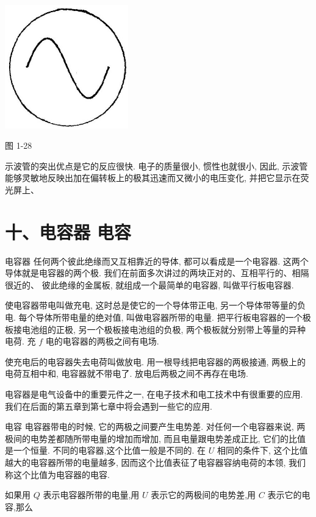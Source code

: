 \documentclass[10pt]{article}
\begin{document}
\begin{center}
\includegraphics[max width=0.4\textwidth]{images/01913056-1f15-74d8-9184-9aab52c9d66b_42_664272.jpg}
\end{center}

图 1-28

示波管的突出优点是它的反应很快. 电子的质量很小, 惯性也就很小, 因此, 示波管能够灵敏地反映出加在偏转板上的极其迅速而又微小的电压变化, 并把它显示在荧光屏上、

\section*{十、电容器 电容}

电容器 任何两个彼此绝缘而又互相靠近的导体, 都可以看成是一个电容器. 这两个导体就是电容器的两个极. 我们在前面多次讲过的两块正对的、互相平行的、相隔很近的、 彼此绝缘的金属板, 就组成一个最简单的电容器, 叫做平行板电容器.

使电容器带电叫做充电, 这时总是使它的一个导体带正电, 另一个导体带等量的负电. 每个导体所带电量的绝对值, 叫做电容器所带的电量. 把平行板电容器的一个极板接电池组的正极, 另一个极板接电池组的负极, 两个极板就分别带上等量的异种电荷. 充 \(f\) 电的电容器的两极之间有电场.

使充电后的电容器失去电荷叫做放电. 用一根导线把电容器的两极接通, 两极上的电荷互相中和, 电容器就不带电了. 放电后两极之间不再存在电场.

电容器是电气设备中的重要元件之一, 在电子技术和电工技术中有很重要的应用. 我们在后面的第五章到第七章中将会遇到一些它的应用.

电容 电容器带电的时候, 它的两极之间要产生电势差. 对任何一个电容器来说, 两极间的电势差都随所带电量的增加而增加, 而且电量跟电势差成正比, 它们的比值是一个恒量. 不同的电容器,这个比值一般是不同的. 在 \(U\) 相同的条件下, 这个比值越大的电容器所带的电量越多, 因而这个比值表征了电容器容纳电荷的本领, 我们称这个比值为电容器的电容.

如果用 \(Q\) 表示电容器所带的电量,用 \(U\) 表示它的两极间的电势差,用 \(C\) 表示它的电容,那么
\end{document}
